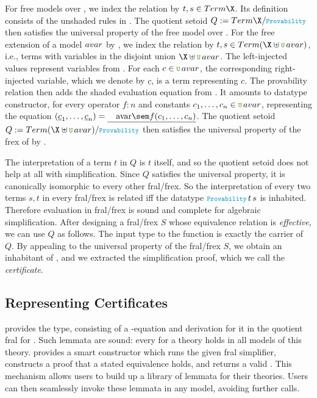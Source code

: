 For free models over \X{}, we index the relation by $t,s \in \Term
\X$.  Its definition consists of the unshaded rules in
. The quotient setoid
$Q \definedby \Term\X/\text{\IdrisType{Provability}}$ then satisfies the universal
property of the free model over \X{}.
%
For the free extension of a model $\avar$ by \X{}, we index the
relation by $t,s \in \Term(\X \uplus \U\,\avar)$, i.e., terms with
variables in the disjoint union $\X \uplus \U\,\avar$. The
left-injected values represent variables from \X{}. For each $c \in
\U\,\avar$, the corresponding right-injected variable, which we denote
by $\underline{c}$, is a term representing $c$.  The provability
relation then adds the shaded evaluation equation from
. It amounts to datatype constructor, for every
operator $f : n$ and constants $c_1, \ldots, c_n \in \U\,\avar$,
representing the equation \( (\underline c_1, \ldots, \underline c_n)
= \underline{\text\avar\sem f(c_1, \ldots, c_n)} \).  The quotient
setoid $Q\definedby \Term(\X \uplus \U\,\avar) /
\text{\IdrisType{Provability}}$ then satisfies the universal property
of the frex of \avar{} by \X.

The interpretation of a term $t$ in $Q$ is $t$ itself, and so the quotient
setoid does not help at all with simplification.  Since $Q$ satisfies
the universal property, it is canonically isomorphic to every other
fral/frex. So the interpretation of every two terms $s,t$ in every
fral/frex is related iff the datatype
$\text{\IdrisType{Provability}}\,t\,s$ is inhabited. Therefore
evaluation in fral/frex is sound and complete for algebraic
simplification.
%
After designing a fral/frex $S$ whose equivalence relation is
\emph{effective}, we can use $Q$ as follows. The input type to the
function  is exactly the carrier of $Q$.  By
appealing to the universal property of the fral/frex $S$, we obtain an
inhabitant of , and we extracted the
simplification proof, which we call the \emph{certificate}.

\subsection{Representing Certificates}
 \Frexlib{} provides the
\FrexLemma{}  type, consisting of a
-equation and derivation
for it in the quotient fral for .
Such lemmata are sound: every \FrexLemma{} for a theory holds
in all models of this theory.
%
\Frexlib{} provides a  smart constructor which
runs the given fral simplifier, constructs a
proof that a stated equivalence holds, and returns a valid
.
This mechanism allows users to build up a library of
lemmata for their theories. Users can then seamlessly invoke
these lemmata in any model, avoiding further \Frexlib{} calls.

